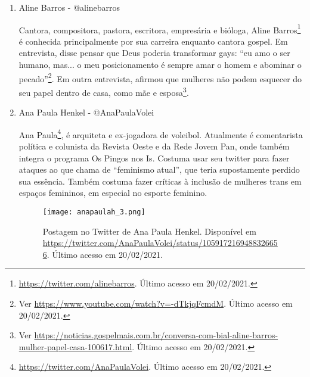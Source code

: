 \documentclass[
	12pt,				%
	openright,			%
	twoside,			%
	a4paper,			%
	english,			%
	brazil				%
	]{abntex2}
\begin{document}
\begin{anexosenv}
\begin{enumerate}
 \item Aline Barros - @alinebarros
 
 Cantora, compositora, pastora, escritora, empresária e bióloga, Aline Barros\footnote{\url{https://twitter.com/alinebarros}. Último acesso em 20/02/2021.} é conhecida principalmente por sua carreira enquanto cantora gospel. Em entrevista, disse pensar que Deus poderia transformar gays: ``eu amo o ser humano, mas... o meu posicionamento é sempre amar o homem e abominar o pecado''\footnote{Ver \url{https://www.youtube.com/watch?v=-dTkjqFcmdM}. Último acesso em 20/02/2021.}. Em outra entrevista, afirmou que mulheres não podem esquecer do seu papel dentro de casa, como mãe e esposa\footnote{Ver \url{https://noticias.gospelmais.com.br/conversa-com-bial-aline-barros-mulher-papel-casa-100617.html}. Último acesso em 20/02/2021.}.
 
 \newpage

 \item Ana Paula Henkel - @AnaPaulaVolei
 
 Ana Paula\footnote{\url{https://twitter.com/AnaPaulaVolei}. Último acesso em 20/02/2021.}, é arquiteta e ex-jogadora de voleibol. Atualmente é comentarista política e colunista da Revista Oeste e da Rede Jovem Pan, onde também integra o programa Os Pingos nos Is. Costuma usar seu twitter para fazer ataques ao que chama de ``feminismo atual'', que teria supostamente perdido sua essência. Também costuma fazer críticas à inclusão de mulheres trans em espaços femininos, em especial no esporte feminino.
 
 
 
 \begin{figure}[!htbp]
    \centering
    \texttt{[image: anapaulah\_3.png]}
    \caption{Postagem no Twitter de Ana Paula Henkel. Disponível em \url{https://twitter.com/AnaPaulaVolei/status/1059172169488326656}. Último acesso em 20/02/2021.}
 \end{figure}


\end{enumerate}
\end{anexosenv}
\end{document}
